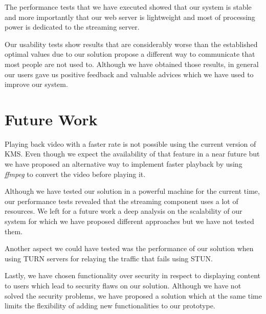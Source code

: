 	The performance tests that we have executed showed that our system is stable and more importantly that our web server is lightweight and most of processing power is dedicated to the streaming server.

	Our usability tests show results that are considerably worse than the established optimal values due to our solution propose a different way to communicate that most people are not used to. Although we have obtained those results, in general our users gave us positive feedback and valuable advices which we have used to improve our system. 

\section{Future Work}
\label{section:future}
	Playing back video with a faster rate is not possible using the current version of \ac{KMS}. Even though we expect the availability of that feature in a near future but we have proposed an alternative way to implement faster playback by using \emph{ffmpeg} to convert the video before playing it.

	Although we have tested our solution in a powerful machine for the current time, our performance tests revealed that the streaming component uses a lot of resources. We left for a future work a deep analysis on the scalability of our system for which we have proposed different approaches but we have not tested them.

	Another aspect we could have tested was the performance of our solution when using \ac{TURN} servers for relaying the traffic that fails using \ac{STUN}.

	Lastly, we have chosen functionality over security in respect to displaying content to users which lead to security flaws on our solution. Although we have not solved the security problems, we have proposed a solution which at the same time limits the flexibility of adding new functionalities to our prototype.
\cleardoublepage

